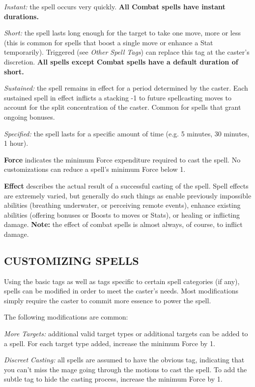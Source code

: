 \documentclass[oneside,10pt]{article}
\begin{document}
\begin{multicols}{2}
\begin{dent}
\textit{Instant:} the spell occurs very quickly. \textbf{All Combat spells
have instant durations.}

\textit{Short:} the spell lasts long enough for the target to take one
move, more or less (this is common for spells that boost a
single move or enhance a Stat temporarily). Triggered (see
\textit{Other Spell Tags}) can replace this tag at the caster’s discretion. \textbf{All spells except Combat spells have a default
duration of short.}

\textit{Sustained:} the spell remains in effect for a period determined by the caster. Each sustained spell in effect inflicts a stacking -1 to future spellcasting moves to account for the split concentration of the caster. Common for spells that
grant ongoing bonuses.

\textit{Specified:} the spell lasts for a specific amount of time (e.g.
5 minutes, 30 minutes, 1 hour).
\end{dent}
\textbf{Force} indicates the minimum Force expenditure required to cast the spell. No customizations can reduce a
spell’s minimum Force below 1.

\textbf{Effect} describes the actual result of a successful casting of
the spell. Spell effects are extremely varied, but generally do
such things as enable previously impossible abilities (breathing underwater, or perceiving remote events), enhance existing abilities (offering bonuses or Boosts to moves or Stats), or
healing or inflicting damage. \textbf{Note:} the effect of combat spells
is almost always, of course, to inflict damage.

\subsection{CUSTOMIZING SPELLS}
Using the basic tags as well as tags specific to certain spell
categories (if any), spells can be modified in order to meet the
caster’s needs. Most modifications simply require the caster
to commit more essence to power the spell.

The following modifications are common:
\begin{dent}

\textit{More Targets:} additional valid target types or additional
targets can be added to a spell. For each target type added, increase the minimum Force by 1.

\textit{Discreet Casting:} all spells are assumed to have the obvious tag, indicating that you can’t miss the mage going
through the motions to cast the spell. To add the subtle tag
to hide the casting process, increase the minimum Force by 1.


\end{dent}
\end{multicols}
\end{document}
